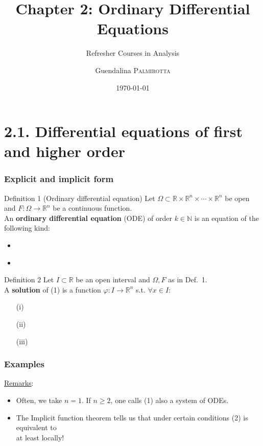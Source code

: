 \documentclass[10pt]{beamer}
\title[Refresher Courses in Analysis] %
{Chapter 2: Ordinary Differential Equations}
\subtitle{Refresher Courses in Analysis}
\author[Guendalina \textsc{Palmirotta}]{Guendalina \textsc{Palmirotta}}
\institute[]{University of Luxembourg, Department of Mathematics}
\date[]{\today}
\newcommand{\R}{\mathbb{R}}
\newcommand{\N}{\mathbb{N}}
\newcommand{\nologo}{\setbeamertemplate{logo}{}}
\begin{document}
\begin{frame}
\titlepage
\end{frame}

{\nologo



\section{2.1. Differential equations of first and higher order}

\begin{frame} \frametitle{Explicit and implicit form}
\begin{alertblock}{Definition 1 (Ordinary differential equation)}
Let $\Omega \subset \R \times \R^n \times \cdots \times \R^n$ be open and $F:\Omega \rightarrow \R^n$ be a continuous function.\\
An \textbf{ordinary differential equation} (ODE) of order $k\in \N$ is an equation of the following kind:
\begin{itemize}
\item \;\\
\vspace{0.2cm}
\item
\end{itemize}
\end{alertblock}

\begin{alertblock}{Definition 2}
Let $I \subset \R$ be an open interval and $\Omega, F$ as in Def.~1.\\
A \textbf{solution} of (1) is a function $\varphi: I \rightarrow \R^n$ s.t. $\forall x \in I$:
\begin{itemize}
\item[(i)]\;\\
\vspace{0.2cm}
\item[(ii)]\;\\
\vspace{0.2cm}
\item[(iii)]
\end{itemize}
\end{alertblock}
\end{frame}

\begin{frame} \frametitle{Examples}
\underline{Remarks}:\\
\begin {itemize}
\item Often, we take $n=1$. If $n\geq 2$, one calls (1) also a system of ODEs.
\item The Implicit function theorem tells us that under certain conditions (2) is equivalent to
$$\;$$
at least locally!
\end{itemize}


\end{frame}}
\end{document}
